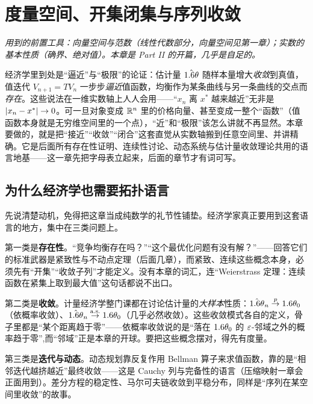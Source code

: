 \chapter{度量空间、开集闭集与序列收敛}
\label{ch:metric}

\noindent\emph{用到的前置工具：向量空间与范数（线性代数部分，向量空间见第一章）；实数的基本性质（确界、绝对值）。本章是 Part II 的开篇，几乎是自足的。}
\medskip

经济学里到处是``逼近''与``极限''的论证：估计量 $\hat{1.6\theta}$ 随样本量增大\emph{收敛}到真值，值迭代 $V_{n+1}=TV_n$ 一步步\emph{逼近}值函数，均衡作为某条曲线与另一条曲线的交点而\emph{存在}。这些说法在一维实数轴上人人会用——``$x_n$ 离 $x^*$ 越来越近''无非是 $\left|x_n-x^*\right|\to 0$。可一旦对象变成 $\mathbb{R}^n$ 里的价格向量、甚至变成一整个``函数''（值函数本身就是无穷维空间里的一个点），``近''和``极限''该怎么讲就不再显然。本章要做的，就是把``接近''``收敛''``闭合''这套直觉从实数轴搬到任意空间里、并讲精确。它是后面所有存在性证明、连续性讨论、动态系统与估计量收敛理论共用的语言地基——这一章先把字母表立起来，后面的章节才有词可写。

\section{为什么经济学也需要拓扑语言}
\label{sec:metric-motivation}

先说清楚动机，免得把这章当成纯数学的礼节性铺垫。经济学家真正要用到这套语言的地方，集中在三类问题上。

第一类是\textbf{存在性}。``竞争均衡存在吗？''``这个最优化问题有没有解？''——回答它们的标准武器是紧致性与不动点定理（后面几章），而紧致、连续这些概念本身，必须先有``开集''``收敛子列''才能定义。没有本章的词汇，连``Weierstrass 定理：连续函数在紧集上取到最大值''这句话都说不出口。

第二类是\textbf{收敛}。计量经济学整门课都在讨论估计量的\emph{大样本}性质：$\hat{1.6\theta}_n\overset{p}{\to}1.6\theta_0$（依概率收敛）、$\hat{1.6\theta}_n\overset{\mathrm{a.s.}}{\to}1.6\theta_0$（几乎必然收敛）。这些收敛模式各自的定义，骨子里都是``某个距离趋于零''——依概率收敛说的是``落在 $1.6\theta_0$ 的 $\varepsilon$-邻域之外的概率趋于零'',而``邻域''正是本章的开球。要把这些概念摆对，得先有度量。

第三类是\textbf{迭代与动态}。动态规划靠反复作用 Bellman 算子来求值函数，靠的是``相邻迭代越挤越近''最终收敛——这是 Cauchy 列与完备性的语言（压缩映射一章会正面用到）。差分方程的稳定性、马尔可夫链收敛到平稳分布，同样是``序列在某空间里收敛''的故事。


